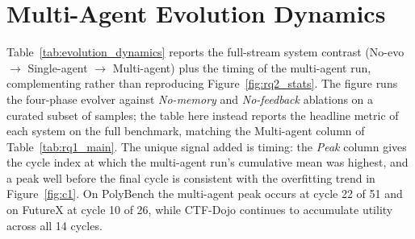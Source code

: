 \documentclass[11pt]{article}
\theoremstyle{plain}
\begin{document}
\begin{table}[t]
\centering\footnotesize
\setlength{\tabcolsep}{4pt}
\caption{Per-category PolyBench metrics. Categories are inferred by keyword match on the trajectory prompt's Event description; \textit{other} catches unmatched markets. Each cell reports \textbf{Accuracy~(\%) / Return~(\%)}. Bold marks the best system per row on Accuracy.}
\label{tab:per_domain_polybench}
\end{table}


\section{Multi-Agent Evolution Dynamics}
\label{app:evolution_dynamics}

Table~\ref{tab:evolution_dynamics} reports the full-stream system contrast (No-evo $\to$ Single-agent $\to$ Multi-agent) plus the timing of the multi-agent run, complementing rather than reproducing Figure~\ref{fig:rq2_stats}. The figure runs the four-phase evolver against \emph{No-memory} and \emph{No-feedback} ablations on a curated subset of samples; the table here instead reports the headline metric of each system on the full benchmark, matching the Multi-agent column of Table~\ref{tab:rq1_main}. The unique signal added is timing: the \emph{Peak} column gives the cycle index at which the multi-agent run's cumulative mean was highest, and a peak well before the final cycle is consistent with the overfitting trend in Figure~\ref{fig:c1}. On PolyBench the multi-agent peak occurs at cycle 22 of 51 and on FutureX at cycle 10 of 26, while CTF-Dojo continues to accumulate utility across all 14 cycles.
\end{document}
